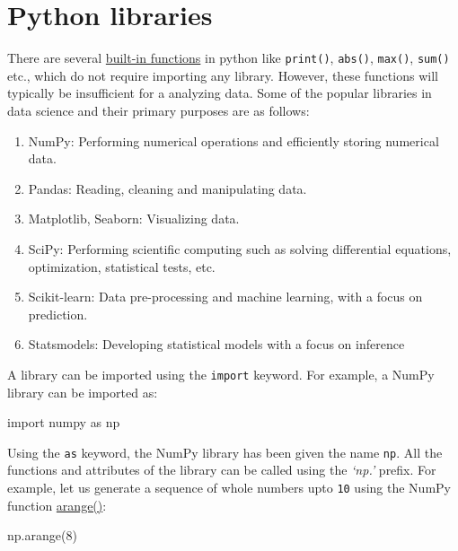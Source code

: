 \documentclass[
  letterpaper,
  DIV=11,
  numbers=noendperiod]{scrreprt}
\newenvironment{Shaded}{\begin{snugshade}}{\end{snugshade}}
\newcommand{\DecValTok}[1]{\textcolor[rgb]{0.68,0.00,0.00}{#1}}
\newcommand{\ImportTok}[1]{\textcolor[rgb]{0.00,0.46,0.62}{#1}}
\newcommand{\NormalTok}[1]{\textcolor[rgb]{0.00,0.23,0.31}{#1}}
\providecommand{\tightlist}{%
  \setlength{\itemsep}{0pt}\setlength{\parskip}{0pt}}\usepackage{longtable,booktabs,array}
\begin{document}
\hypertarget{python-libraries}{%
\section{Python libraries}\label{python-libraries}}

There are several
\href{https://docs.python.org/3/library/functions.html}{built-in
functions} in python like \texttt{print()}, \texttt{abs()},
\texttt{max()}, \texttt{sum()} etc., which do not require importing any
library. However, these functions will typically be insufficient for a
analyzing data. Some of the popular libraries in data science and their
primary purposes are as follows:

\begin{enumerate}
\def\labelenumi{\arabic{enumi}.}
\tightlist
\item
  NumPy: Performing numerical operations and efficiently storing
  numerical data.
\item
  Pandas: Reading, cleaning and manipulating data.
\item
  Matplotlib, Seaborn: Visualizing data.
\item
  SciPy: Performing scientific computing such as solving differential
  equations, optimization, statistical tests, etc.
\item
  Scikit-learn: Data pre-processing and machine learning, with a focus
  on prediction.
\item
  Statsmodels: Developing statistical models with a focus on inference
\end{enumerate}

A library can be imported using the \texttt{import} keyword. For
example, a NumPy library can be imported as:

\begin{Shaded}
\begin{Highlighting}[]
\ImportTok{import}\NormalTok{ numpy }\ImportTok{as}\NormalTok{ np}
\end{Highlighting}
\end{Shaded}

Using the \texttt{as} keyword, the NumPy library has been given the name
\texttt{np}. All the functions and attributes of the library can be
called using the \emph{`np.'} prefix. For example, let us generate a
sequence of whole numbers upto \texttt{10} using the NumPy function
\href{https://numpy.org/doc/stable/reference/generated/numpy.arange.html}{arange()}:

\begin{Shaded}
\begin{Highlighting}[]
\NormalTok{np.arange(}\DecValTok{8}\NormalTok{)}
\end{Highlighting}
\end{Shaded}
\end{document}
